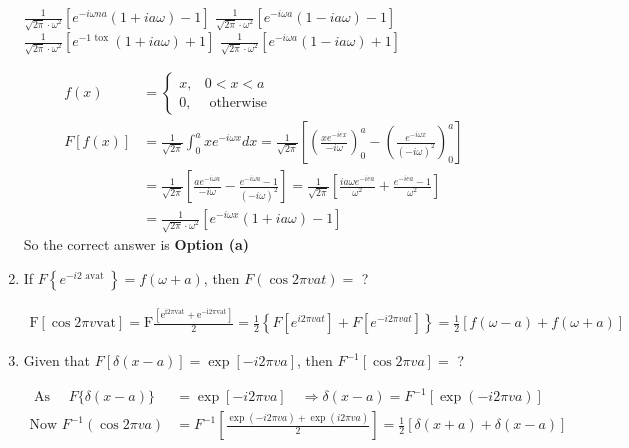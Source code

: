 \begin{enumerate}
\begin{tasks}
		\task[\textbf{a.}]$\frac{1}{\sqrt{2 \pi} \cdot \omega^{2}}\left[e^{-i \omega n a}(1+i a \omega)-1\right]$
		\task[\textbf{b.}]$\frac{1}{\sqrt{2 \pi} \cdot \omega^{2}}\left[e^{-i \omega a}(1-i a \omega)-1\right]$
		\task[\textbf{c.}] $\frac{1}{\sqrt{2 \pi} \cdot \omega^{2}}\left[e^{-1 \text { tox }}(1+i a \omega)+1\right]$
		\task[\textbf{d.}] $\frac{1}{\sqrt{2 \pi} \cdot \omega^{2}}\left[e^{-i \omega a}(1-i a \omega)+1\right]$
	\end{tasks}
	\begin{answer}
	\begin{align*}
	f(x)&= \begin{cases}x, & 0<x<a \\ 0, & \text { otherwise }\end{cases}\\
	F[f(x)]&=\frac{1}{\sqrt{2 \pi}} \int_{0}^{a} x e^{-i \omega x} d x=\frac{1}{\sqrt{2 \pi}}\left[\left(\frac{x e^{-i e x}}{-i \omega}\right)_{0}^{a}-\left(\frac{e^{-i \omega x}}{(-i \omega)^{2}}\right)_{0}^{a}\right]\\&=\frac{1}{\sqrt{2 \pi}}\left[\frac{a e^{-i \omega a}}{-i \omega}-\frac{e^{-i \omega a}-1}{(-i \omega)^{2}}\right]=\frac{1}{\sqrt{2 \pi}}\left[\frac{i a \omega e^{-i e a}}{\omega^{2}}+\frac{e^{-i e a}-1}{\omega^{2}}\right]\\
	&=\frac{1}{\sqrt{2 \pi} \cdot \omega^{2}}\left[e^{-i \omega x}(1+i a \omega)-1\right]
	\end{align*}
	So the correct answer is \textbf{Option (a)}
\end{answer}


\item	If $F\left\{e^{-i 2 \text { avat }}\right\}=f(\omega+a)$, then $F(\cos 2 \pi v a t)=$ ?

\begin{answer}
	\begin{align*}
	\mathrm{F}[\cos 2 \pi v \mathrm{vat}]=\mathrm{F} \frac{\left[\mathrm{e}^{\mathrm{i} 2 \pi \mathrm{vat}}+\mathrm{e}^{-\mathrm{i} 2 \pi \mathrm{vat}}\right]}{2}=\frac{1}{2}\left\{F\left[e^{i 2 \pi v a t}\right]+F\left[e^{-i 2 \pi v a t}\right]\right\}=\frac{1}{2}[f(\omega-a)+f(\omega+a)]
	\end{align*}
\end{answer}

\item	Given that $F[\delta(x-a)]=\exp [-i 2 \pi v a]$, then $F^{-1}[\cos 2 \pi v a]=$ ?

\begin{answer}
	\begin{align*}
	\text{	As }\quad F\{\delta(x-a)\}&=\exp [-i 2 \pi v a] \quad \Rightarrow \delta(x-a)=F^{-1}[\exp (-i 2 \pi v a)]\\
	\text{Now }F^{-1}(\cos 2 \pi v a)&=F^{-1}\left[\frac{\exp (-i 2 \pi v a)+\exp (i 2 \pi v a)}{2}\right]=\frac{1}{2}[\delta(x+a)+\delta(x-a)]
	\end{align*}
\end{answer}


\end{enumerate}
